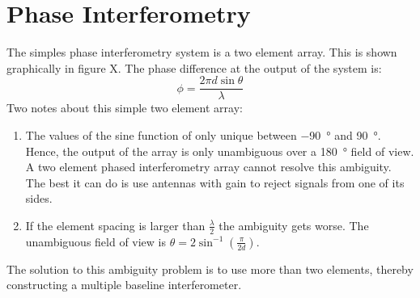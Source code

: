 \section{Phase Interferometry}
The simples phase interferometry system is a two element array. This is shown graphically in figure X. The phase difference at the output of the system is:
\begin{equation}
\phi = \frac{2 \pi d \sin \theta}{\lambda}
\end{equation}
Two notes about this simple two element array:
\begin{enumerate}
  \item The values of the sine function of only unique between \SI{-90}{\degree} and \SI{90}{\degree}. Hence, the output of the array is only unambiguous over a \SI{180}{\degree} field of view. A two element phased interferometry array cannot resolve this ambiguity. The best it can do is use antennas with gain to reject signals from one of its sides. 
 \item If the element spacing is larger than \(\frac{\lambda}{2}\) the ambiguity gets worse. The unambiguous field of view is \(\theta = 2 \sin^{-1}(\frac{\pi}{2d})\).
 \end{enumerate}
 The solution to this ambiguity problem is to use more than two elements, thereby constructing a multiple baseline interferometer. 
